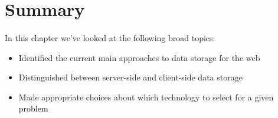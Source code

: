 \section{Summary}
\paragraph{} In this chapter we’ve looked at the following broad topics:
\begin{itemize}
\item Identified the current main approaches to data storage for the web
\item Distinguished between server-side and client-side data storage
\item Made appropriate choices about which technology to select for a given problem
\end{itemize}

